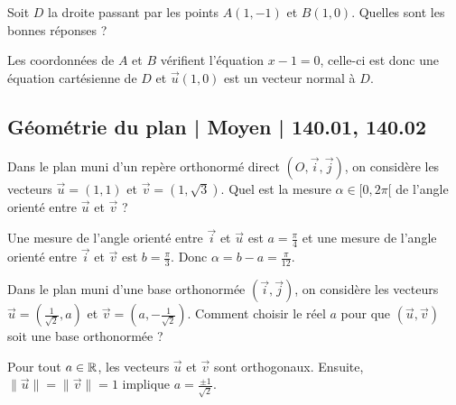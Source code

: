 \begin{question}
Soit $D$ la droite passant par les points $A(1,-1)$ et $B(1,0)$. Quelles sont les bonnes réponses ?
\begin{answers}  
\end{answers}
\begin{explanations}
Les coordonnées de $A$ et $B$ vérifient l'équation $x-1=0$, celle-ci est donc une équation cartésienne de $D$ et $\vec{u}(1,0)$ est un vecteur normal à $D$.
\end{explanations}
\end{question}


\subsection{Géométrie du plan | Moyen | 140.01, 140.02}


\begin{question}
Dans le plan muni d'un repère orthonormé direct $(O,\vec{i},\vec{j})$, on considère les vecteurs $\displaystyle \vec{u}=\left(1,1\right)$ et $\displaystyle \vec{v}=\left(1,\sqrt{3}\right)$. Quel est la mesure $\alpha \in [0,2\pi[$ de l'angle orienté entre $\vec{u}$ et $\vec{v}$ ?
\begin{answers}  
\end{answers}
\begin{explanations}
Une mesure de l'angle orienté entre $\vec{i}$ et $\vec{u}$ est $\displaystyle a=\frac{\pi}{4}$ et une mesure de l'angle orienté entre $\vec{i}$ et $\vec{v}$ est $\displaystyle b=\frac{\pi}{3}$. Donc $\displaystyle \alpha =b-a=\frac{\pi}{12}$.
\end{explanations}
\end{question}


\begin{question}
Dans le plan muni d'une base orthonormée $(\vec{i},\vec{j})$, on considère les vecteurs $\displaystyle \vec{u}=\left(\frac{1}{\sqrt{2}},a\right)$ et $\displaystyle \vec{v}=\left(a,-\frac{1}{\sqrt{2}}\right)$. Comment choisir le réel $a$ pour que $(\vec{u},\vec{v})$ soit une base orthonormée ?
\begin{answers}  
\end{answers}
\begin{explanations}
Pour tout $a\in \mathbb{R}$, les vecteurs $\vec{u}$ et $\vec{v}$ sont orthogonaux. Ensuite, $\|\vec{u}\|=\|\vec{v}\|=1$ implique $\displaystyle a=\frac{\pm 1}{\sqrt{2}}$.
\end{explanations}
\end{question}



